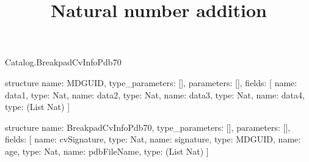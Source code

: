 \begin{lexlean}{Catalog.BreakpadCvInfoPdb70}
\title{Natural number addition}
\begin{semanticmodule}
structure{
  name: MDGUID,
  type_parameters: [],
  parameters: [],
  fields: [
    {name: data1, type: Nat},
    {name: data2, type: Nat},
    {name: data3, type: Nat},
    {name: data4, type: (List Nat)}
  ]
}

structure{
  name: BreakpadCvInfoPdb70,
  type_parameters: [],
  parameters: [],
  fields: [
    {name: cvSignature, type: Nat},
    {name: signature, type: MDGUID},
    {name: age, type: Nat},
    {name: pdbFileName, type: (List Nat)}
  ]
}
\end{semanticmodule}
\end{lexlean}
